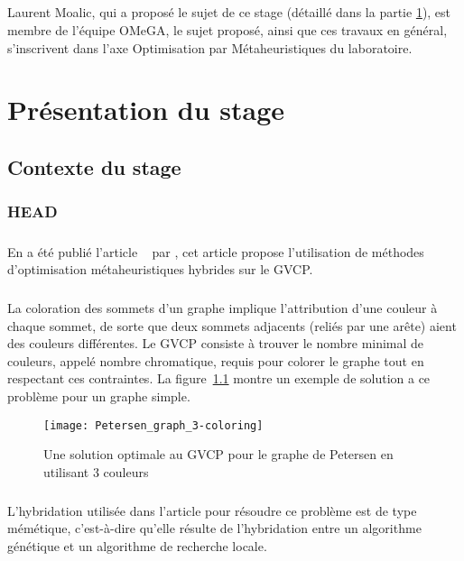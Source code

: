 \documentclass[a4paper,11pt,twoside,french,report]{../common/simplem}
\begin{document}
				\paragraph*{}
					Laurent Moalic, qui a proposé le sujet de ce stage (détaillé dans la partie \ref{sec:presentation_stage}), est membre de l'équipe \gls{OMeGA}, le sujet proposé, ainsi que ces travaux en général, s’inscrivent dans l'axe Optimisation par Métaheuristiques du laboratoire.
	\chapter{Présentation du stage}\label{sec:presentation_stage}
		\section{Contexte du stage}
			\subsection{\acrshort{HEAD}}
				\paragraph*{}
					En \citeyear{Moalic2018} a été publié l'article ~\cite{Moalic2018} par \citeauthor{Moalic2018}, cet article propose l'utilisation de méthodes d'optimisation métaheuristiques hybrides sur le \gls{GVCP}.
				\paragraph*{}
					La coloration des sommets d'un graphe implique l'attribution d'une couleur à chaque sommet, de sorte que deux sommets adjacents (reliés par une arête) aient des couleurs différentes. Le \gls{GVCP} consiste à trouver le nombre minimal de couleurs, appelé nombre chromatique, requis pour colorer le graphe tout en respectant ces contraintes. La figure~\ref{fig:Petersen_graph_3-coloring} montre un exemple de solution a ce problème pour un graphe simple.
					\begin{figure}[H]
						\centering%
						\texttt{[image: Petersen\_graph\_3-coloring]}%
						\caption{Une solution optimale au \acrshort{GVCP} pour le graphe de Petersen en utilisant 3 couleurs~\cite{wiki:Graphe_de_Petersen}}%
						\label{fig:Petersen_graph_3-coloring}%
					\end{figure}
				\paragraph*{}
					L'hybridation utilisée dans l'article pour résoudre ce problème est de type mémétique, c'est-à-dire qu'elle résulte de l'hybridation entre un algorithme génétique et un algorithme de recherche locale.
\end{document}

